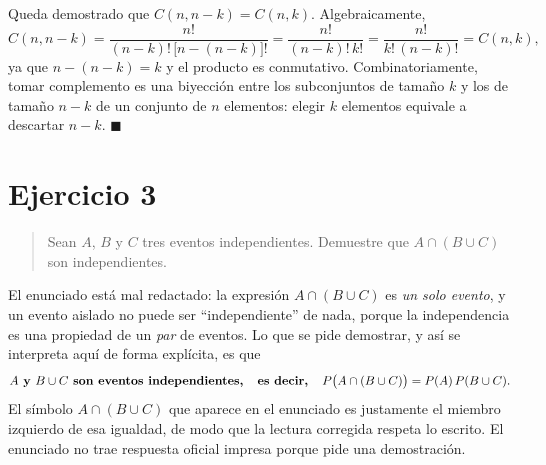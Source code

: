 \documentclass[11pt]{article}
\begin{document}
\begin{resp}
Queda demostrado que $C(n,n-k)=C(n,k)$. Algebraicamente,
\[
C(n,n-k)=\frac{n!}{(n-k)!\,\bigl[n-(n-k)\bigr]!}=\frac{n!}{(n-k)!\,k!}=\frac{n!}{k!\,(n-k)!}=C(n,k),
\]
ya que $n-(n-k)=k$ y el producto es conmutativo. Combinatoriamente, tomar complemento es una
biyección entre los subconjuntos de tamaño $k$ y los de tamaño $n-k$ de un conjunto de $n$
elementos: elegir $k$ elementos equivale a descartar $n-k$. $\blacksquare$
\end{resp}

\section*{Ejercicio 3}

\begin{quote}
Sean $A$, $B$ y $C$ tres eventos independientes. Demuestre que $A\cap(B\cup C)$ son independientes.
\end{quote}

\begin{nota}
El enunciado está mal redactado: la expresión $A\cap(B\cup C)$ es \emph{un solo evento}, y un
evento aislado no puede ser ``independiente'' de nada, porque la independencia es una
propiedad de un \emph{par} de eventos. Lo que se pide demostrar, y así se interpreta aquí de
forma explícita, es que
\[
\textbf{$A$ y $B\cup C$ son eventos independientes,\quad es decir,\quad}
P\bigl(A\cap(B\cup C)\bigr)=P(A)\,P(B\cup C).
\]
El símbolo $A\cap(B\cup C)$ que aparece en el enunciado es justamente el miembro izquierdo de
esa igualdad, de modo que la lectura corregida respeta lo escrito. El enunciado no trae
respuesta oficial impresa porque pide una demostración.
\end{nota}
\end{document}
